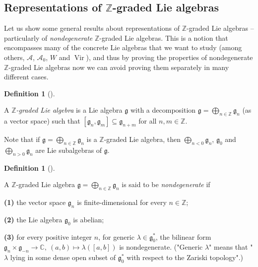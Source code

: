 \documentclass
[numbers=enddot,12pt,final,onecolumn,german,notitlepage]{scrartcl}%
\theoremstyle{definition}
\newtheorem{defi}[theo]{Definition}
\newenvironment{definition}[1][]
{\begin{defi}[#1]\begin{leftbar}}
{\end{leftbar}\end{defi}}
\begin{document}
\subsection{Representations of $\mathbb{Z}$-graded Lie algebras}

Let us show some general results about representations of $\mathbb{Z}$-graded
Lie algebras -- particularly of \textit{nondegenerate} $\mathbb{Z}$-graded Lie
algebras. This is a notion that encompasses many of the concrete Lie algebras
that we want to study (among others, $\mathcal{A}$, $\mathcal{A}_{0}$, $W$ and
$\operatorname*{Vir}$), and thus by proving the properties of nondegenerate
$\mathbb{Z}$-graded Lie algebras now we can avoid proving them separately in
many different cases.

\begin{definition}
\label{def.gradLie}A $\mathbb{Z}$\textit{-graded Lie algebra} is a Lie algebra
$\mathfrak{g}$ with a decomposition $\mathfrak{g}=\bigoplus\limits_{n\in
\mathbb{Z}}\mathfrak{g}_{n}$ (as a vector space) such that $\left[
\mathfrak{g}_{n},\mathfrak{g}_{m}\right]  \subseteq\mathfrak{g}_{n+m}$ for all
$n,m\in\mathbb{Z}$.
\end{definition}

Note that if $\mathfrak{g}=\bigoplus\limits_{n\in\mathbb{Z}}\mathfrak{g}_{n}$
is a $\mathbb{Z}$-graded Lie algebra, then $\bigoplus\limits_{n<0}%
\mathfrak{g}_{n}$, $\mathfrak{g}_{0}$ and $\bigoplus\limits_{n>0}%
\mathfrak{g}_{n}$ are Lie subalgebras of $\mathfrak{g}$.

\begin{definition}
\label{def.gradLienondeg}A $\mathbb{Z}$-graded Lie algebra $\mathfrak{g}%
=\bigoplus\limits_{n\in\mathbb{Z}}\mathfrak{g}_{n}$ is said to be
\textit{nondegenerate} if

\textbf{(1)} the vector space $\mathfrak{g}_{n}$ is finite-dimensional for
every $n\in\mathbb{Z}$;

\textbf{(2)} the Lie algebra $\mathfrak{g}_{0}$ is abelian;

\textbf{(3)} for every positive integer $n$, for generic $\lambda
\in\mathfrak{g}_{0}^{\ast}$, the bilinear form $\mathfrak{g}_{n}%
\times\mathfrak{g}_{-n}\rightarrow\mathbb{C},\ \left(  a, b\right)
\mapsto\lambda\left(  \left[  a,b\right]  \right)  $ is nondegenerate.
("Generic $\lambda$" means that "$\lambda$ lying in some dense open subset of
$\mathfrak{g}_{0}^{\ast}$ with respect to the Zariski topology".)
\end{definition}
\end{document}
